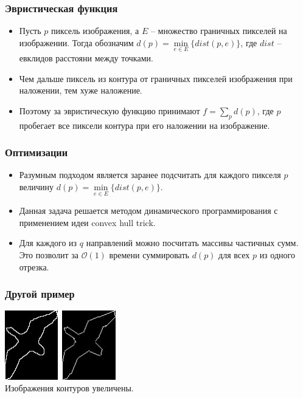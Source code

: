 \begin{frame}\frametitle{Эвристическая функция}
    \begin{itemize}
        \item Пусть $p$ пиксель изображения, а $E$ -- множество граничных пикселей на изображении.
        Тогда обозначим $d(p) = \min\limits_{e \in E}\{dist(p, e)\}$, где $dist$ -- евклидов расстояни
        между точками.
        \pause
        \item Чем дальше пиксель из контура от граничных пикселей изображения при наложении, тем хуже наложение.
        \pause
        \item Поэтому за эвристическую функцию принимают $f = \sum\limits_{p}{d(p)}$, где $p$ пробегает
        все пиксели контура при его наложении на изображение.
    \end{itemize}
\end{frame}

\begin{frame}\frametitle{Оптимизации}
    \begin{itemize}
        \item Разумным подходом является заранее подсчитать для каждого пикселя
        $p$ величину $d(p) = \min\limits_{e \in E}\{dist(p, e)\}$.
        \pause
        \item Данная задача решается методом динамического программирования с
        применением идеи convex hull trick.
        \pause
        \item Для каждого из $q$ направлений можно посчитать массивы частичных сумм.
        Это позволит за $\mathcal{O}(1)$ времени суммировать $d(p)$ для всех
        $p$ из одного отрезка.
    \end{itemize}
\end{frame}

\begin{frame}\frametitle{Другой пример}
    \begin{center}
        \includegraphics[height=3cm]{veselov_imgs/pattern1.jpg}\
        \includegraphics[height=3cm]{veselov_imgs/l_pttrn1.jpg}\\
        Изображения контуров увеличены.
    \end{center}
\end{frame}

